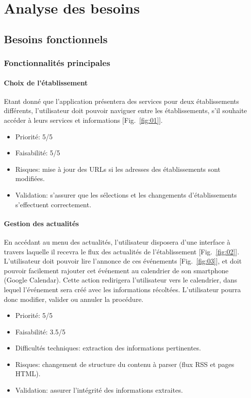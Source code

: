 \documentclass [pdftex,12pt] {report}
\begin{document}
\chapter{Analyse des besoins}

\section{Besoins fonctionnels}
\subsection{Fonctionnalités principales}
\subsubsection{Choix de l'établissement}
Etant donné que l'application présentera des services pour deux établissements différents, l'utilisateur doit pouvoir naviguer entre les établissements, s'il souhaite accéder à leurs services et informations [Fig.~\ref{fig:01}]. \\

\begin{itemize}
\renewcommand{\labelitemi}{$\bullet$}
\item Priorité: 5/5
\item Faisabilité: 5/5
\item Risques: mise à jour des URLs si les adresses des établissements sont modifiées.
\item Validation: s'assurer que les sélections et les changements d'établissements s'effectuent correctement.
\end{itemize}

\subsubsection{Gestion des actualités}
En accédant au menu des actualités, l'utilisateur disposera d'une interface à travers laquelle il recevra le flux des actualités de l'établissement [Fig.~\ref{fig:02}]. L'utilisateur doit pouvoir lire l'annonce de ces événements [Fig.~\ref{fig:03}], et doit pouvoir facilement rajouter cet événement au calendrier de son smartphone (Google Calendar). Cette action redirigera l'utilisateur vers le calendrier, dans lequel l'événement sera créé avec les informations récoltées. L'utilisateur pourra donc modifier, valider ou annuler la procédure. \\

\begin{itemize}
\renewcommand{\labelitemi}{$\bullet$}
\item Priorité: 5/5
\item Faisabilité: 3.5/5
\item Difficultés techniques: extraction des informations pertinentes.
\item Risques: changement de structure du contenu à parser (flux RSS et pages HTML).
\item Validation: assurer l'intégrité des informations extraites.
\end{itemize}
\end{document}
